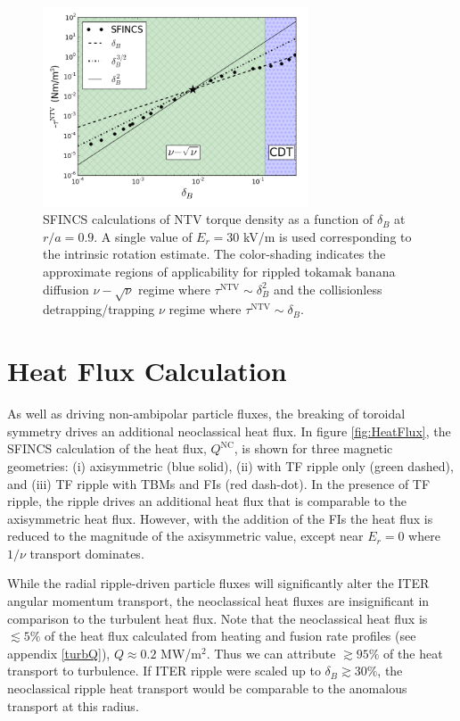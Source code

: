\documentclass[aip, pop, preprint]{revtex4-1}
\numberwithin{figure}{section}
\numberwithin{equation}{section}
\begin{document}
\begin{figure}[h!]
\centering
\includegraphics[width=0.7\textwidth]
{scalescan.png}
\caption{\label{fig:scalescan} SFINCS calculations of NTV torque density as a function of $\delta_B$ at $r/a = 0.9$. A single value of $E_r = 30$ kV/m is used corresponding to the intrinsic rotation estimate. The color-shading indicates the approximate regions of applicability for rippled tokamak banana diffusion $\nu-\sqrt{\nu}$ regime where $\tau^{\text{NTV}} \sim \delta_B^2$\cite{Shaing2008} and the collisionless detrapping/trapping $\nu$ regime where $\tau^{\text{NTV}} \sim \delta_B$.\cite{Shaing2009}}
\end{figure} 

\FloatBarrier

\section{Heat Flux Calculation}\label{heatflux}
As well as driving non-ambipolar particle fluxes, the breaking of toroidal symmetry drives an additional neoclassical heat flux. In figure \ref{fig:HeatFlux}, the SFINCS calculation of the heat flux, $Q^{\text{NC}}$, is shown for three magnetic geometries: (i) axisymmetric (blue solid), (ii) with TF ripple only (green dashed), and (iii) TF ripple with TBMs and FIs (red dash-dot). In the presence of TF ripple, the ripple drives an additional heat flux that is comparable to the axisymmetric heat flux. However, with the addition of the FIs the heat flux is reduced to the magnitude of the axisymmetric value, except near $E_r = 0$ where $1/\nu$ transport dominates. 

While the radial ripple-driven particle fluxes will significantly alter the ITER angular momentum transport, the neoclassical heat fluxes are insignificant in comparison to the turbulent heat flux. Note that the neoclassical heat flux is $\lesssim 5\%$  of the heat flux calculated from heating and fusion rate profiles (see appendix \ref{turbQ}), $Q\approx 0.2$ MW/m$^2$. Thus we can attribute $\gtrsim 95\%$ of the heat transport to turbulence. If ITER ripple were scaled up to $\delta_B \gtrsim 30\%$, the neoclassical ripple heat transport would be comparable to the anomalous transport at this radius.
\end{document}
